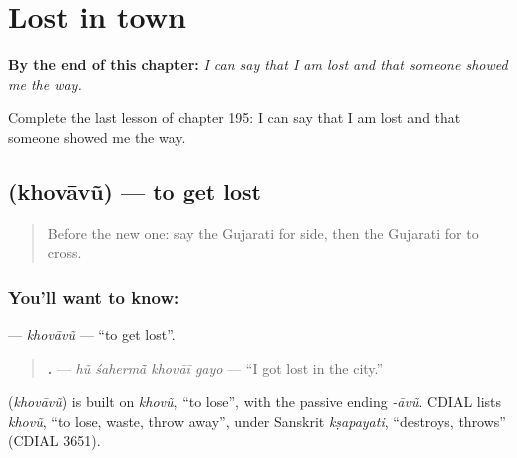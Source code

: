 
\chapter{Lost in town}
\label{ch:gu-lost-in-town}

\begin{chapteropening}
\textbf{By the end of this chapter:} \emph{I can say that I am lost and that someone showed me the way.}

Complete the last lesson of chapter 195: I can say that I am lost and that someone showed me the way.
\end{chapteropening}

\section[\texorpdfstring{\gu{ખોવાવું} (khovāvũ)}{ખોવાવું (khovāvũ)}]{ (khovāvũ) — to get lost}

\label{lesson:GU-C195-khovavu}



\begin{quote}
Before the new one: say the Gujarati for side, then the Gujarati for to cross.
\end{quote}

\subsection*{You'll want to know: }
\textbf{} — \emph{khovāvũ} — \textquotedblleft{}to get lost\textquotedblright{}.

\begin{quote}
\textbf{   .} — \emph{hũ śahermā̃ khovāī gayo} — \textquotedblleft{}I got lost in the city.\textquotedblright{}
\end{quote}

\begin{cousinweb}
\textbf{} (\emph{khovāvũ}) is built on \emph{khovũ}, \textquotedblleft{}to lose\textquotedblright{}, with the passive ending \emph{-āvũ}. CDIAL lists \emph{khovũ}, \textquotedblleft{}to lose, waste, throw away\textquotedblright{}, under Sanskrit \emph{kṣapayati}, \textquotedblleft{}destroys, throws\textquotedblright{} (CDIAL 3651).
\end{cousinweb}


